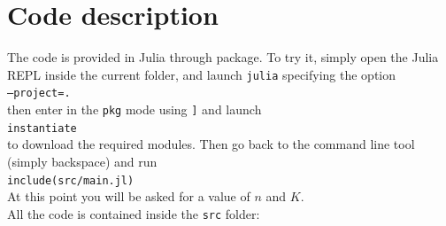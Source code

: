 \documentclass[notitlepage]{article}
\begin{document}
\restoregeometry


\section{Code description}

The code is provided in Julia through package. To try it, simply open the Julia REPL inside the current folder, and launch \texttt{julia} specifying the option\\[0.2ex]
\hspace*{0.5ex}\hspace{0.5ex}\hspace{0.5ex}\texttt{--project=.}\\[0.2ex]
then enter in the \texttt{pkg} mode using \texttt{]} and launch\\[0.2ex]
\hspace*{0.5ex}\hspace{0.5ex}\hspace{0.5ex}\texttt{instantiate}\\[0.2ex]
to download the required modules. Then go back to the command line tool (simply backspace) and run\\[0.2ex]
\hspace*{0.5ex}\hspace{0.5ex}\hspace{0.5ex}\texttt{include(src/main.jl)}\\[0.2ex]
At this point you will be asked for a value of $n$ and $K$.\\
All the code is contained inside the \texttt{src} folder:
\end{document}
